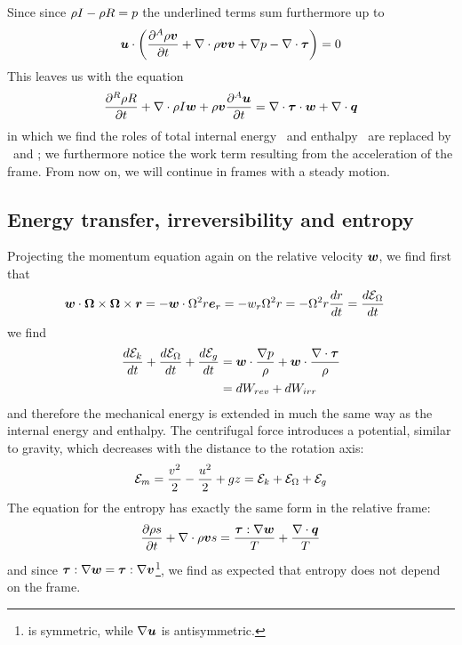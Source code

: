Since since $\rho I - \rho R = p$ the underlined terms
sum furthermore up to
\begin{align*}
  \boldsymbol {u} \cdot \left(\frac{\partial^A \rho \boldsymbol {v}}{\partial t} + 
    \nabla \cdot \rho \boldsymbol {v} \boldsymbol {v}
    + \nabla p - \nabla \cdot \boldsymbol {\tau}\right) = 0
\end{align*}
This leaves us with the equation 
\begin{equation}
  \frac{\partial^R \rho R}{\partial t}  + 
  \nabla \cdot \rho I \boldsymbol {w} + 
  \rho \boldsymbol {v} \frac{\partial^A \boldsymbol {u}}{\partial t} 
  = 
  \nabla \cdot \boldsymbol {\tau} \cdot \boldsymbol {w} + 
  \nabla \cdot \boldsymbol {q}
\end{equation}
in which we find the roles of total internal energy \tEner~and
enthalpy \tEnth~are replaced by \roenergy~and \rothalpy; we
furthermore notice the work term resulting from the acceleration of
the frame. From now on, we will continue in frames with a steady
motion.

\subsection{Energy transfer, irreversibility and entropy}

Projecting the momentum equation again on the relative velocity
$\boldsymbol {w}$, we find first that
\begin{align*}
  \boldsymbol {w} \cdot \boldsymbol {\Omega} \times \boldsymbol {\Omega} \times \boldsymbol {r} 
  &= - \boldsymbol {w} \cdot \Omega^2 r \boldsymbol e_{r} = - w_r \Omega^2 r = - \Omega^2 r \frac{dr}{dt} = \frac{d\mathcal E_{\Omega}}{dt}
\end{align*}
we find
\begin{align*}
   \frac{d\mathcal E_k}{dt}  +  \frac{d\mathcal E_{\Omega}}{dt} +  \frac{d\mathcal E_g}{dt} &= 
  \boldsymbol {w} \cdot \frac{\nabla p}{\rho} + 
  \boldsymbol {w} \cdot \frac{\nabla \cdot \boldsymbol {\tau}}{\rho} \\
  &= dW_{rev} + dW_{irr} 
\end{align*}
and therefore the mechanical energy is extended in much the same way
as the internal energy and enthalpy. The centrifugal force introduces a
potential, similar to gravity, which decreases with the distance to
the rotation axis:
\begin{align*}
  \mathcal E_m = \frac{v^2}{2} - \frac{u^2}{2} + g z = \mathcal E_k + \mathcal E_{\Omega} + \mathcal E_g
\end{align*}
The equation for the entropy has exactly the same form in the relative
frame:
\begin{equation}
  \frac{\partial \rho s}{\partial t} + \nabla \cdot \rho \boldsymbol {v} s = 
  \frac{\boldsymbol {\tau} : \nabla \boldsymbol {w}}{T} + \frac{\nabla \cdot \boldsymbol {q}}{T} 
\end{equation}
and since $\boldsymbol {\tau} : \nabla \boldsymbol {w} = \boldsymbol {\tau} : \nabla \boldsymbol {v}$\footnote{\shearStressT is symmetric, while $\nabla \boldsymbol {u}$ is
  antisymmetric.}, we find as expected that entropy does not depend on
the frame.

